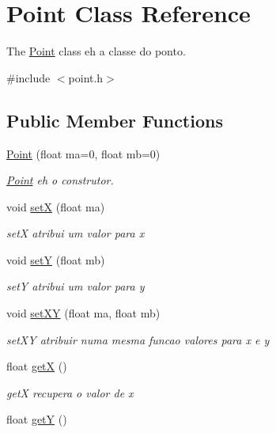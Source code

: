 \hypertarget{classPoint}{}\section{Point Class Reference}
\label{classPoint}


The \hyperlink{classPoint}{Point} class eh a classe do ponto.  




{\ttfamily \#include $<$point.\+h$>$}

\subsection*{Public Member Functions}
\begin{DoxyCompactItemize}
\item 
\hyperlink{classPoint_aa84e690033216c9f4acb9de9668d1b43}{Point} (float ma=0, float mb=0)
\begin{DoxyCompactList}\small\item\em \hyperlink{classPoint}{Point} eh o construtor. \end{DoxyCompactList}\item 
void \hyperlink{classPoint_afd8f011561bdf747fea5643607d66fd8}{setX} (float ma)
\begin{DoxyCompactList}\small\item\em setX atribui um valor para x \end{DoxyCompactList}\item 
void \hyperlink{classPoint_af353ef94911bbd02e51795a77b802d64}{setY} (float mb)
\begin{DoxyCompactList}\small\item\em setY atribui um valor para y \end{DoxyCompactList}\item 
void \hyperlink{classPoint_a499169a418da1f39d267cd0890879886}{set\+XY} (float ma, float mb)
\begin{DoxyCompactList}\small\item\em set\+XY atribuir numa mesma funcao valores para x e y \end{DoxyCompactList}\item 
float \hyperlink{classPoint_acc27466778cc87a662bba40268c4c0c8}{getX} ()
\begin{DoxyCompactList}\small\item\em getX recupera o valor de x \end{DoxyCompactList}\item 
float \hyperlink{classPoint_a3cccbca94719ddde353cce86ce0e2f64}{getY} ()

\end{DoxyCompactItemize}
